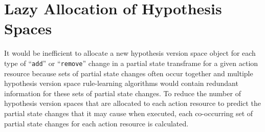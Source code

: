 \section{Lazy Allocation of Hypothesis Spaces}

It would be inefficient to allocate a new hypothesis version space
object for each type of ``{\tt{add}}'' or ``{\tt{remove}}'' change in
a partial state transframe for a given action resource because sets of
partial state changes often occur together and multiple hypothesis
version space rule-learning algorithms would contain redundant
information for these sets of partial state changes.  To reduce the
number of hypothesis version spaces that are allocated to each action
resource to predict the partial state changes that it may cause when
executed, each co-occurring set of partial state changes for each
action resource is calculated.

